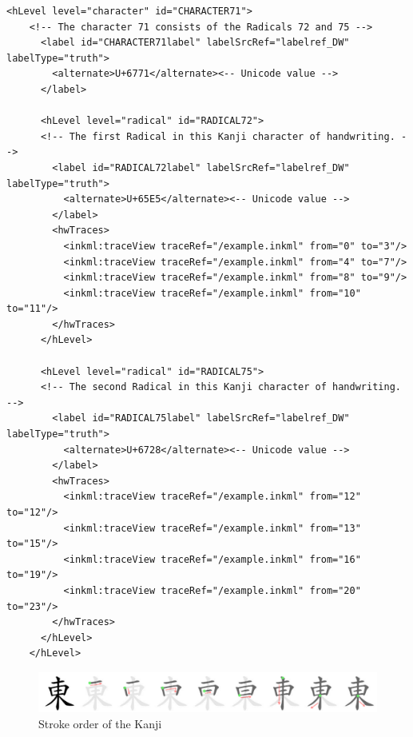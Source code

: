 \begin{xmlcode}
  \begin{lstlisting}[emph={hLevel,hwTraces,label,alternative},
                     emphstyle=\color{blue}\textbf,
                     emph={[2]level,labelSrcRef,labelType,traceRef,from,to},
                     emphstyle={[2]\color{red}},
                     caption={A character representation in UPX},
                     label=lst:charaterdataformat]
    <hLevel level="character" id="CHARACTER71">
    <!-- The character 71 consists of the Radicals 72 and 75 -->
      <label id="CHARACTER71label" labelSrcRef="labelref_DW" labelType="truth">
        <alternate>U+6771</alternate><-- Unicode value -->
      </label>

      <hLevel level="radical" id="RADICAL72">
      <!-- The first Radical in this Kanji character of handwriting. -->
        <label id="RADICAL72label" labelSrcRef="labelref_DW" labelType="truth">
          <alternate>U+65E5</alternate><-- Unicode value -->
        </label>
        <hwTraces>
          <inkml:traceView traceRef="/example.inkml" from="0" to="3"/>
          <inkml:traceView traceRef="/example.inkml" from="4" to="7"/>
          <inkml:traceView traceRef="/example.inkml" from="8" to="9"/>
          <inkml:traceView traceRef="/example.inkml" from="10" to="11"/>
        </hwTraces>
      </hLevel>

      <hLevel level="radical" id="RADICAL75">
      <!-- The second Radical in this Kanji character of handwriting. -->
        <label id="RADICAL75label" labelSrcRef="labelref_DW" labelType="truth">
          <alternate>U+6728</alternate><-- Unicode value -->
        </label>
        <hwTraces>
          <inkml:traceView traceRef="/example.inkml" from="12" to="12"/>
          <inkml:traceView traceRef="/example.inkml" from="13" to="15"/>
          <inkml:traceView traceRef="/example.inkml" from="16" to="19"/>
          <inkml:traceView traceRef="/example.inkml" from="20" to="23"/>
        </hwTraces>
      </hLevel>
    </hLevel>
  \end{lstlisting}
\end{xmlcode}

\begin{figure}[htbp]
\begin{center}
\includegraphics{images/radicalStructure/EAST-strokeorder.png}
\caption{Stroke order of the Kanji }
\label{fig:strokeorderof東}
\end{center}
\end{figure}

